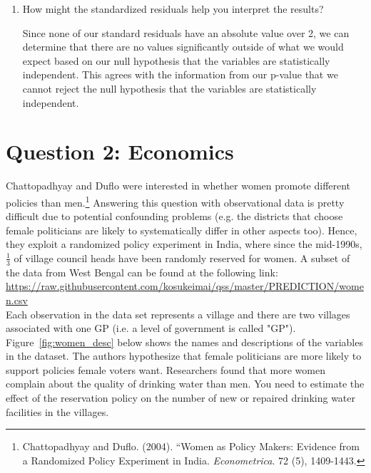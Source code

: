 \documentclass[12pt,letterpaper]{article}
\begin{document}
\begin{enumerate}
\begin{table}[h]
\begin{tabular}{l | c c c }
			\end{tabular}
		\end{table}
		
		\item [(d)] How might the standardized residuals help you interpret the results?  
		
		\vspace{.5cm}
		
		\noindent Since none of our standard residuals have an absolute value over 2, we can determine that there are no values significantly outside of what we would expect based on our null hypothesis that the variables are statistically independent. This agrees with the \break information from our p-value that we cannot reject the null hypothesis that the \break variables are statistically independent. 
		
	\end{enumerate}
	\newpage
	
	\section*{Question 2: Economics}
	Chattopadhyay and Duflo were interested in whether women promote different policies than men.\footnote{Chattopadhyay and Duflo. (2004). ``Women as Policy Makers: Evidence from a Randomized Policy Experiment in India. \textit{Econometrica}. 72 (5), 1409-1443.} Answering this question with observational data is pretty difficult due to potential confounding problems (e.g. the districts that choose female politicians are likely to systematically differ in other aspects too). Hence, they exploit a randomized policy experiment in India, where since the mid-1990s, $\frac{1}{3}$ of village council heads have been randomly reserved for women. A subset of the data from West Bengal can be found at the following link: \url{https://raw.githubusercontent.com/kosukeimai/qss/master/PREDICTION/women.csv}\\
	
	\noindent Each observation in the data set represents a village and there are two villages associated with one GP (i.e. a level of government is called "GP"). Figure~\ref{fig:women_desc} below shows the names and descriptions of the variables in the dataset. The authors hypothesize that female politicians are more likely to support policies female voters want. Researchers found that more women complain about the quality of drinking water than men. You need to estimate the effect of the reservation policy on the number of new or repaired drinking water facilities in the villages.
	\vspace{.5cm}
	
\end{document}

